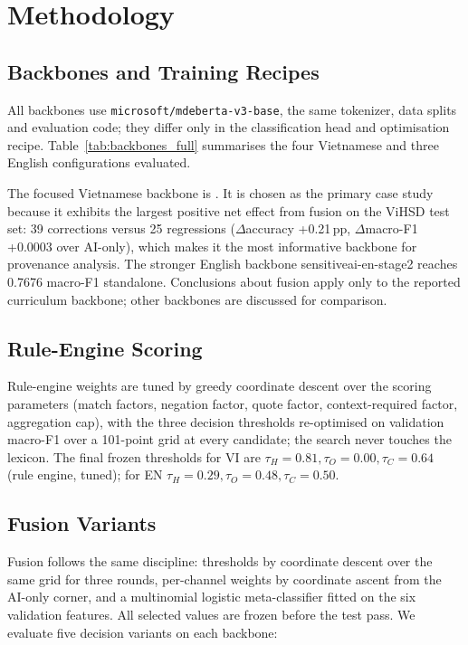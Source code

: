 \section{Methodology}
\label{sec:methodology}

\subsection{Backbones and Training Recipes}
All backbones use \texttt{microsoft/mdeberta-v3-base}, the same tokenizer,
data splits and evaluation code; they differ only in the classification head
and optimisation recipe.  Table~\ref{tab:backbones_full} summarises the four
Vietnamese and three English configurations evaluated.



The focused Vietnamese backbone is .  It is
chosen as the primary case study because it exhibits the largest positive net
effect from fusion on the ViHSD test set: 39 corrections versus 25
regressions ($\Delta$accuracy +0.21\,pp, $\Delta$macro-F1 +0.0003 over AI-only),
which makes it the most informative backbone for provenance analysis.  The stronger English backbone
sensitiveai-en-stage2 reaches 0.7676 macro-F1 standalone.  Conclusions about fusion
apply only to the reported curriculum backbone; other backbones are discussed for
comparison.

\subsection{Rule-Engine Scoring}
Rule-engine weights are tuned by greedy coordinate descent over the scoring
parameters (match factors, negation factor, quote factor, context-required
factor, aggregation cap), with the three decision thresholds re-optimised on
validation macro-F1 over a 101-point grid at every candidate; the search never
touches the lexicon.  The final frozen thresholds for VI are
$\tau_H=0.81, \tau_O=0.00, \tau_C=0.64$ (rule engine, tuned); for EN
$\tau_H=0.29, \tau_O=0.48, \tau_C=0.50$.

\subsection{Fusion Variants}
\label{sec:fusion_variants}
Fusion follows the same discipline: thresholds by coordinate descent over the
same grid for three rounds, per-channel weights by coordinate ascent from the
AI-only corner, and a multinomial logistic meta-classifier fitted on the six
validation features.  All selected values are frozen before the test pass.  We
evaluate five decision variants on each backbone:

